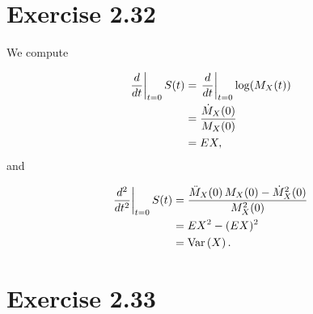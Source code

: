 \documentclass[12pt,letterpaper,reqno]{amsart}
\numberwithin{equation}{subsection}
\begin{document}
\newpage
\section{Exercise 2.32}

We compute

\begin{align*}
    \left.\frac{d{}}{d{t}} \right\vert_{t=0} {S}\! \left( {t} \right)
    &= \left.\frac{d{}}{d{t}} \right\vert_{t=0} {\log}\! \left( {{M_X}\! \left( {t} \right)} \right) \\
    &= \frac{{\dot{M}_X}\! \left( {0} \right)}{{M_X}\! \left( {0} \right)} \\
    &= EX,
\end{align*}
and

\begin{align*}
    \left.\frac{d{^2}}{d{t^2}} \right\vert_{t=0} {S}\! \left( {t} \right)
    &= \frac{{\ddot{M}_X}\! \left( {0} \right) {M_X}\! \left( {0} \right) - {\dot{M}^2_X}\! \left( {0} \right)}{{M^2_X}\! \left( {0} \right)} \\
    &= EX^2 - (EX)^2 \\
    &= \operatorname{Var}\left( {X} \right).
\end{align*}

\newpage
\section{Exercise 2.33}
\end{document}
